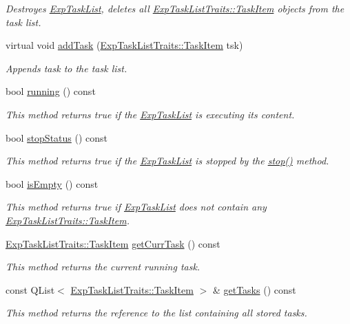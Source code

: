 \begin{DoxyCompactItemize}
\begin{DoxyCompactList}\small\item\em Destroyes \hyperlink{class_exp_task_list}{Exp\+Task\+List}, deletes all \hyperlink{struct_exp_task_list_traits_1_1_task_item}{Exp\+Task\+List\+Traits\+::\+Task\+Item} objects from the task list. \end{DoxyCompactList}\item 
virtual void \hyperlink{class_exp_task_list_a3e582c5e9ce6f23f86de96d885277fd2}{add\+Task} (\hyperlink{struct_exp_task_list_traits_1_1_task_item}{Exp\+Task\+List\+Traits\+::\+Task\+Item} tsk)
\begin{DoxyCompactList}\small\item\em Appends task to the task list. \end{DoxyCompactList}\item 
bool \hyperlink{class_exp_task_list_ab48c2f2cdc847964481885c15d56b8fd}{running} () const 
\begin{DoxyCompactList}\small\item\em This method returns true if the \hyperlink{class_exp_task_list}{Exp\+Task\+List} is executing its content. \end{DoxyCompactList}\item 
bool \hyperlink{class_exp_task_list_a791b0db466c6144af5fbe9e9954aaa9a}{stop\+Status} () const 
\begin{DoxyCompactList}\small\item\em This method returns true if the \hyperlink{class_exp_task_list}{Exp\+Task\+List} is stopped by the \hyperlink{class_exp_task_list_ae3542825c792c23c1f2a54b9d63074d1}{stop()} method. \end{DoxyCompactList}\item 
bool \hyperlink{class_exp_task_list_afe0b0c53938d3ee5dcd154306bba39e8}{is\+Empty} () const 
\begin{DoxyCompactList}\small\item\em This method returns true if \hyperlink{class_exp_task_list}{Exp\+Task\+List} does not contain any \hyperlink{struct_exp_task_list_traits_1_1_task_item}{Exp\+Task\+List\+Traits\+::\+Task\+Item}. \end{DoxyCompactList}\item 
\hyperlink{struct_exp_task_list_traits_1_1_task_item}{Exp\+Task\+List\+Traits\+::\+Task\+Item} \hyperlink{class_exp_task_list_a9a99c3b7f558ec7248019d1323e22256}{get\+Curr\+Task} () const 
\begin{DoxyCompactList}\small\item\em This method returns the current running task. \end{DoxyCompactList}\item 
const Q\+List$<$ \hyperlink{struct_exp_task_list_traits_1_1_task_item}{Exp\+Task\+List\+Traits\+::\+Task\+Item} $>$ \& \hyperlink{class_exp_task_list_a608f181f27787a3e72c2388cc47ca177}{get\+Tasks} () const 
\begin{DoxyCompactList}\small\item\em This method returns the reference to the list containing all stored tasks. \end{DoxyCompactList}\end{DoxyCompactItemize}
